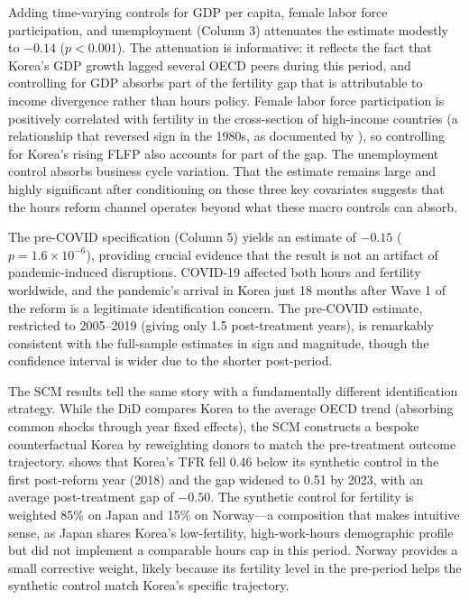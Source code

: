 \documentclass[12pt]{article}
\begin{document}
Adding time-varying controls for GDP per capita, female labor force participation, and unemployment (Column 3) attenuates the estimate modestly to $-0.14$ ($p < 0.001$). The attenuation is informative: it reflects the fact that Korea's GDP growth lagged several OECD peers during this period, and controlling for GDP absorbs part of the fertility gap that is attributable to income divergence rather than hours policy. Female labor force participation is positively correlated with fertility in the cross-section of high-income countries (a relationship that reversed sign in the 1980s, as documented by \citet{luci2014impact}), so controlling for Korea's rising FLFP also accounts for part of the gap. The unemployment control absorbs business cycle variation. That the estimate remains large and highly significant after conditioning on these three key covariates suggests that the hours reform channel operates beyond what these macro controls can absorb.

The pre-COVID specification (Column 5) yields an estimate of $-0.15$ ($p = 1.6 \times 10^{-6}$), providing crucial evidence that the result is not an artifact of pandemic-induced disruptions. COVID-19 affected both hours and fertility worldwide, and the pandemic's arrival in Korea just 18 months after Wave 1 of the reform is a legitimate identification concern. The pre-COVID estimate, restricted to 2005--2019 (giving only 1.5 post-treatment years), is remarkably consistent with the full-sample estimates in sign and magnitude, though the confidence interval is wider due to the shorter post-period.

The SCM results tell the same story with a fundamentally different identification strategy. While the DiD compares Korea to the average OECD trend (absorbing common shocks through year fixed effects), the SCM constructs a bespoke counterfactual Korea by reweighting donors to match the pre-treatment outcome trajectory.  shows that Korea's TFR fell 0.46 below its synthetic control in the first post-reform year (2018) and the gap widened to 0.51 by 2023, with an average post-treatment gap of $-0.50$. The synthetic control for fertility is weighted 85\% on Japan and 15\% on Norway---a composition that makes intuitive sense, as Japan shares Korea's low-fertility, high-work-hours demographic profile but did not implement a comparable hours cap in this period. Norway provides a small corrective weight, likely because its fertility level in the pre-period helps the synthetic control match Korea's specific trajectory.
\end{document}
